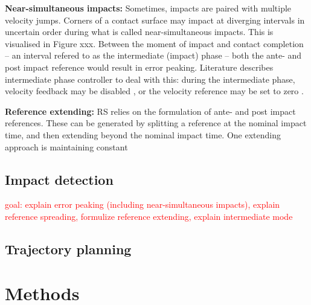 \documentclass[a4paper, 10pt, conference]{ieeeconf}
\begin{document}
   \textbf{Near-simultaneous impacts:} Sometimes, impacts are paired with multiple velocity jumps.  Corners of a contact surface may impact at diverging intervals in uncertain order during what is called near-simultaneous impacts. This is visualised in Figure xxx. Between the moment of impact and contact completion -- an interval refered to as the intermediate (impact) phase -- both the ante- and post impact reference would result in error peaking. Literature describes intermediate phase controller to deal with this: during the intermediate phase, velocity feedback may be disabled \cite{vansteenRobotControlSimultaneous2021}, or the velocity reference may be set to zero \cite{uitendaalTeachingRobotsInteraction2022}. 

   \textbf{Reference extending:} RS relies on the formulation of  ante- and post impact references. These can be generated by splitting a reference at the nominal impact time, and then extending beyond the nominal impact time. One extending approach is maintaining constant 
    \subsection{Impact detection}
    \textcolor{red}{goal: explain error peaking (including near-simultaneous impacts), explain reference spreading, formulize reference extending, explain intermediate mode}\\
    \subsection{Trajectory planning}

    \section{Methods}
\end{document}
